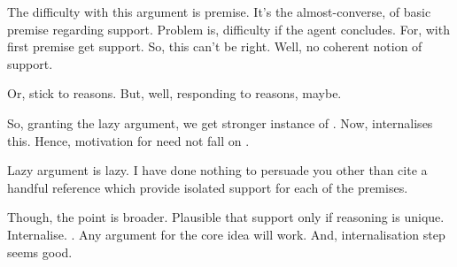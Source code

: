 \begin{note}
  The difficulty with this argument is premise.
  It's the almost-converse, of basic premise regarding support.
  Problem is, difficulty if the agent concludes.
  For, with first premise get support.
  So, this can't be right.
  Well, no coherent notion of support.

  Or, stick to reasons.
  But, well, responding to reasons, maybe.
\end{note}

\begin{note}
  So, granting the lazy argument, we get stronger instance of \zS{}.
  Now, \qzS{} internalises this.
  Hence, motivation for \qzS{} need not fall on \scen{}.

  Lazy argument is lazy.
  I have done nothing to persuade you other than cite a handful reference which provide isolated support for each of the premises.

  Though, the point is broader.
  Plausible that support only if reasoning is unique.
  Internalise.
  \qzS{}.
  Any argument for the core idea will work.
  And, internalisation step seems good.
\end{note}

\subsection{}
\label{sec:requ3-plus}

